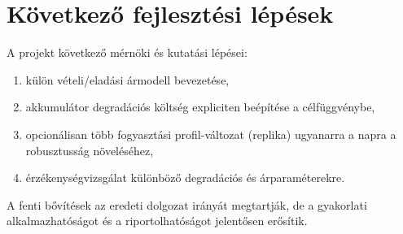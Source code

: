 \section{Következő fejlesztési lépések}
A projekt következő mérnöki és kutatási lépései:
\begin{enumerate}
  \item külön vételi/eladási ármodell bevezetése,
  \item akkumulátor degradációs költség expliciten beépítése a célfüggvénybe,
  \item opcionálisan több fogyasztási profil-változat (replika) ugyanarra a napra a robusztusság növeléséhez,
  \item érzékenységvizsgálat különböző degradációs és árparaméterekre.
\end{enumerate}

A fenti bővítések az eredeti dolgozat irányát megtartják, de a gyakorlati alkalmazhatóságot és a riportolhatóságot jelentősen erősítik.
